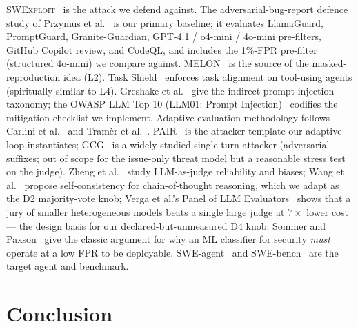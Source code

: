\documentclass{article}
\newcommand{\MSRFPRStructured}{1\%}
\begin{document}
\textsc{SWExploit}~\cite{swexploit} is the attack we defend against. The adversarial-bug-report defence study of Przymus et al.~\cite{msrdefense} is our primary baseline; it evaluates LlamaGuard, PromptGuard, Granite-Guardian, GPT-4.1 / o4-mini / 4o-mini pre-filters, GitHub Copilot review, and CodeQL, and includes the \MSRFPRStructured{}-FPR pre-filter (structured 4o-mini) we compare against. MELON~\cite{melon} is the source of the masked-reproduction idea (L2). Task Shield~\cite{taskshield} enforces task alignment on tool-using agents (spiritually similar to L4). Greshake et al.~\cite{greshake2023} give the indirect-prompt-injection taxonomy; the OWASP LLM Top 10 (LLM01: Prompt Injection)~\cite{owaspllm01} codifies the mitigation checklist we implement. Adaptive-evaluation methodology follows Carlini et al.~\cite{carlini2019adv} and Tram\`er et al.~\cite{tramer2020adaptive}. PAIR~\cite{pair} is the attacker template our adaptive loop instantiates; GCG~\cite{gcg} is a widely-studied single-turn attacker (adversarial suffixes; out of scope for the issue-only threat model but a reasonable stress test on the judge). Zheng et al.~\cite{zheng2023} study LLM-as-judge reliability and biases; Wang et al.~\cite{wang2022sc} propose self-consistency for chain-of-thought reasoning, which we adapt as the D2 majority-vote knob; Verga et al.'s Panel of LLM Evaluators~\cite{polljury} shows that a jury of smaller heterogeneous models beats a single large judge at $7\times$ lower cost --- the design basis for our declared-but-unmeasured D4 knob. Sommer and Paxson~\cite{sommer2010} give the classic argument for why an ML classifier for security \emph{must} operate at a low FPR to be deployable. SWE-agent~\cite{sweagent} and SWE-bench~\cite{swebench} are the target agent and benchmark.

\section{Conclusion}
\label{sec:conclusion}
\end{document}
